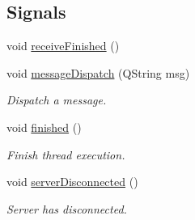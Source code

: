 \subsection*{Signals}
\begin{DoxyCompactItemize}
\item 
void \hyperlink{classNetworkToQtInterface_aac3748797653d3164ff714edafda229a}{receive\-Finished} ()
\item 
void \hyperlink{classNetworkToQtInterface_a254dd8693e87acd8b05fc36d154b3393}{message\-Dispatch} (Q\-String msg)
\begin{DoxyCompactList}\small\item\em Dispatch a message. \end{DoxyCompactList}\item 
void \hyperlink{classNetworkToQtInterface_a1e20584cc20259fa76c180e087dc1a9f}{finished} ()
\begin{DoxyCompactList}\small\item\em Finish thread execution. \end{DoxyCompactList}\item 
void \hyperlink{classNetworkToQtInterface_a889713b57c1e461e7191add0820bb338}{server\-Disconnected} ()
\begin{DoxyCompactList}\small\item\em Server has disconnected. \end{DoxyCompactList}\end{DoxyCompactItemize}
